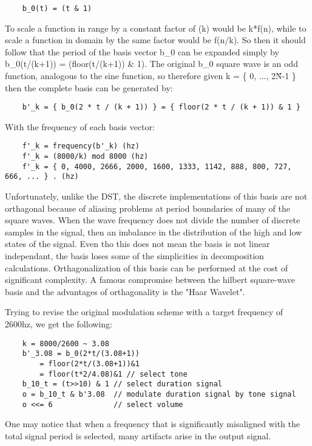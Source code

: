 \documentclass[11pt]{book}
\begin{document}
\begin{verbatim}
	b_0(t) = (t & 1)
\end{verbatim}

To scale a function in range by a constant factor of (k) would be k*f(n), while to scale a function in domain by the same factor would be f(n/k).
So then it should follow that the period of the basis vector b\_0 can be expanded simply by b\_0(t/(k+1)) = (floor(t/(k+1)) \& 1). The original b\_0 square
wave is an odd function, analogous to the sine function, so therefore given k = \{ 0, ..., 2\^N-1 \} then the complete basis can be generated by:

\begin{verbatim}
	b'_k = { b_0(2 * t / (k + 1)) } = { floor(2 * t / (k + 1)) & 1 }
\end{verbatim}

With the frequency of each basis vector:

\begin{verbatim}
	f'_k = frequency(b'_k) (hz)
	f'_k = (8000/k) mod 8000 (hz)
	f'_k = { 0, 4000, 2666, 2000, 1600, 1333, 1142, 888, 800, 727, 666, ... } . (hz)
\end{verbatim}

Unfortunately, unlike the DST, the discrete implementations of this basis are not orthagonal because of aliasing problems at period boundaries
of many of the square waves.  When the wave frequency does not divide the number of discrete samples in the signal, then an imbalance in the
distribution of the high and low states of the signal. Even tho this does not mean the basis is not linear independant, the basis loses some of
the simplicities in decomposition calculations. Orthagonalization of this basis can be performed at the cost of significant complexity. A famous
compromise between the hilbert square-wave basis and the advantages of orthagonality is the "Haar Wavelet".

Trying to revise the original modulation scheme with a target frequency of 2600hz, we get the following:

\begin{verbatim}
	k = 8000/2600 ~ 3.08
	b'_3.08 = b_0(2*t/(3.08+1))
		= floor(2*t/(3.08+1))&1
		= floor(t*2/4.08)&1 // select tone
	b_10_t = (t>>10) & 1 // select duration signal
	o = b_10_t & b'3.08  // modulate duration signal by tone signal
	o <<= 6              // select volume
\end{verbatim}

One may notice that when a frequency that is significantly misaligned with the total signal period is selected, many artifacts arise
in the output signal.
\end{document}
